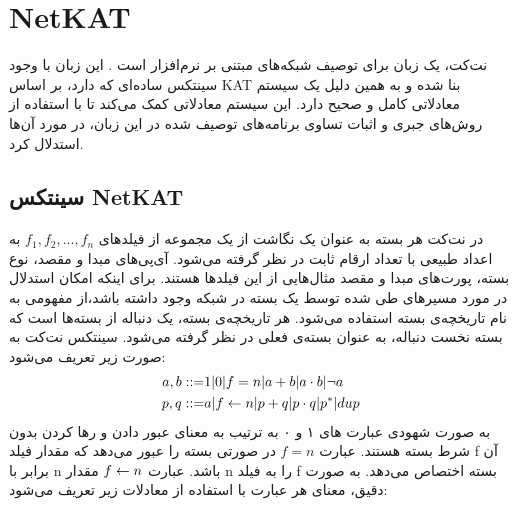 \section{NetKAT}
نت‌کت، یک زبان برای توصیف شبکه‌های مبتنی بر نرم‌افزار است
\cite{netkat}.
این زبان با وجود سینتکس ساده‌ای که دارد، بر اساس
KAT
\cite{kat}
بنا شده و به همین دلیل یک سیستم معادلاتی کامل و صحیح دارد.
این سیستم معادلاتی کمک می‌کند تا با استفاده از روش‌های جبری و اثبات تساوی برنامه‌های توصیف شده در این زبان، در مورد آن‌ها استدلال کرد.

\subsection{سینتکس NetKAT}
در نت‌کت هر بسته به عنوان یک نگاشت از یک مجموعه از فیلد‌های
$f_1,f_2,...,f_n$
به اعداد طبیعی با تعداد ارقام ثابت در نظر گرفته می‌شود.
آی‌پی‌های مبدا و مقصد، نوع بسته، پورت‌های مبدا و مقصد مثال‌هایی از این فیلد‌ها هستند.
برای اینکه امکان استدلال در مورد مسیر‌های طی شده توسط یک بسته‌ در شبکه وجود داشته باشد،از مفهومی به نام تاریخچه‌ی بسته استفاده می‌شود.
هر تاریخچه‌ی بسته‌، یک دنباله از بسته‌ها است که بسته نخست دنباله، به عنوان بسته‌ی فعلی در نظر گرفته می‌شود.
سینتکس نت‌کت به صورت زیر تعریف می‌شود:
\begin{align*}
    a,b ::= & 1 | 0 | f = n | a + b | a \cdot b | \neg a  \\
    p,q ::= & a | f \leftarrow n | p + q | p \cdot q | p^* | dup
\end{align*}
به صورت شهودی
عبارت های ۱ و ۰ به ترتیب به معنای عبور دادن و رها کردن بدون شرط بسته هستند.
عبارت
$f=n$
در صورتی بسته را عبور می‌دهد که مقدار فیلد
f
آن برابر با
n
باشد.
عبارت
$f \leftarrow n$
مقدار n
را به فیلد f
بسته اختصاص می‌دهد.
به صورت دقیق، معنای هر عبارت با استفاده از معادلات زیر تعریف می‌شود:
